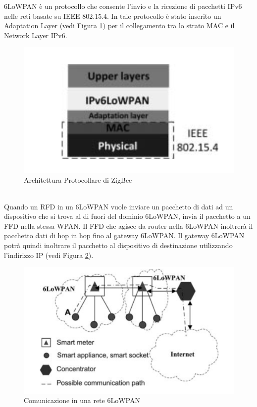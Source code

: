 \newline\newline
6LoWPAN è un protocollo che consente l'invio e la ricezione di pacchetti IPv6 nelle reti basate su IEEE 802.15.4. In tale protocollo è stato inserito un Adaptation Layer (vedi Figura \ref{fig:6pan}) per il collegamento tra lo strato MAC e il Network Layer IPv6.
\begin{figure}[h]
	\centering
	\includegraphics[scale=0.350]{imgs/6pan.png}
	\caption{Architettura Protocollare di ZigBee} \label{fig:6pan}
\end{figure}
\\
Quando un RFD in un 6LoWPAN vuole inviare un pacchetto di dati ad un dispositivo che si trova al di fuori del dominio 6LoWPAN, invia il pacchetto a un FFD nella stessa WPAN. Il FFD che agisce da router nella 6LoWPAN inoltrerà il pacchetto dati di hop in hop fino al gateway 6LoWPAN. Il gateway 6LoWPAN potrà quindi inoltrare il pacchetto al dispositivo di destinazione utilizzando l'indirizzo IP (vedi Figura \ref{fig:6pancom}).
\begin{figure}[h]
	\centering
	\includegraphics[scale=0.350]{imgs/6pancom.png}
	\caption{Comunicazione in una rete 6LoWPAN} \label{fig:6pancom}
\end{figure}
